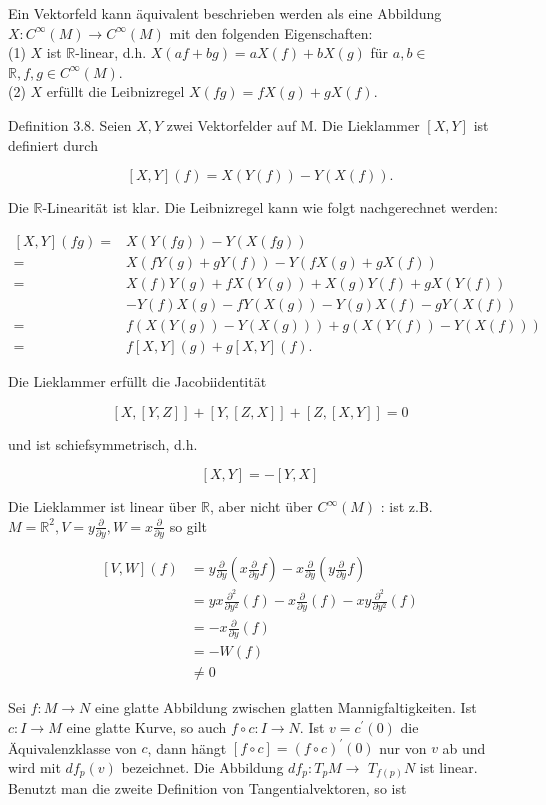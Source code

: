 \documentclass[10pt]{article}
\begin{document}
Ein Vektorfeld kann äquivalent beschrieben werden als eine Abbildung $X: C^{\infty}(M) \rightarrow C^{\infty}(M)$ mit den folgenden Eigenschaften:\\
(1) $X$ ist $\mathbb{R}$-linear, d.h. $X(a f+b g)=a X(f)+b X(g)$ für $a, b \in$ $\mathbb{R}, f, g \in C^{\infty}(M)$.\\
(2) $X$ erfüllt die Leibnizregel $X(f g)=f X(g)+g X(f)$.

Definition 3.8. Seien $X, Y$ zwei Vektorfelder auf M. Die Lieklammer $[X, Y]$ ist definiert durch

$$
[X, Y](f)=X(Y(f))-Y(X(f)) .
$$

Die $\mathbb{R}$-Linearität ist klar. Die Leibnizregel kann wie folgt nachgerechnet werden:

$$
\begin{aligned}
{[X, Y](f g)=} & X(Y(f g))-Y(X(f g)) \\
= & X(f Y(g)+g Y(f))-Y(f X(g)+g X(f)) \\
= & X(f) Y(g)+f X(Y(g))+X(g) Y(f)+g X(Y(f)) \\
& -Y(f) X(g)-f Y(X(g))-Y(g) X(f)-g Y(X(f)) \\
= & f(X(Y(g))-Y(X(g)))+g(X(Y(f))-Y(X(f))) \\
= & f[X, Y](g)+g[X, Y](f) .
\end{aligned}
$$

Die Lieklammer erfüllt die Jacobiidentität

$$
[X,[Y, Z]]+[Y,[Z, X]]+[Z,[X, Y]]=0
$$

und ist schiefsymmetrisch, d.h.

$$
[X, Y]=-[Y, X]
$$

Die Lieklammer ist linear über $\mathbb{R}$, aber nicht über $C^{\infty}(M)$ : ist z.B. $M=\mathbb{R}^{2}, V=y \frac{\partial}{\partial y}, W=x \frac{\partial}{\partial y}$ so gilt

$$
\begin{aligned}
{[V, W](f) } & =y \frac{\partial}{\partial y}\left(x \frac{\partial}{\partial y} f\right)-x \frac{\partial}{\partial y}\left(y \frac{\partial}{\partial y} f\right) \\
& =y x \frac{\partial^{2}}{\partial y^{2}}(f)-x \frac{\partial}{\partial y}(f)-x y \frac{\partial^{2}}{\partial y^{2}}(f) \\
& =-x \frac{\partial}{\partial y}(f) \\
& =-W(f) \\
& \neq 0
\end{aligned}
$$

Sei $f: M \rightarrow N$ eine glatte Abbildung zwischen glatten Mannigfaltigkeiten. Ist $c: I \rightarrow M$ eine glatte Kurve, so auch $f \circ c: I \rightarrow N$. Ist $v=c^{\prime}(0)$ die Äquivalenzklasse von $c$, dann hängt $[f \circ c]=(f \circ c)^{\prime}(0)$ nur von $v$ ab und wird mit $d f_{p}(v)$ bezeichnet. Die Abbildung $d f_{p}: T_{p} M \rightarrow$ $T_{f(p)} N$ ist linear. Benutzt man die zweite Definition von Tangentialvektoren, so ist
\end{document}

